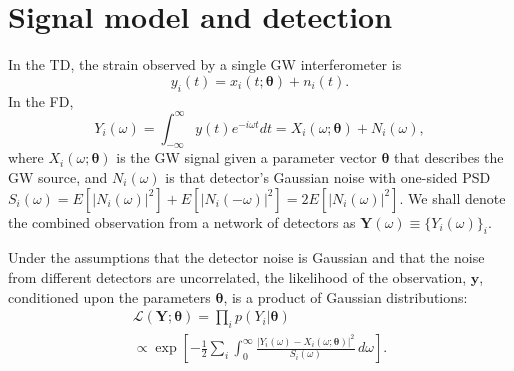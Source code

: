 \documentclass[amsmath,amssymb,aps,prx,reprint,nopreprintnumbers,nofootinbib]{revtex4-1}
\begin{document}

\section{Signal model and detection}
\label{sec:detection}

In the \ac{TD}, the strain observed by a single \ac{GW} interferometer is
%
\begin{equation}
    y_i(t) = x_i (t; \bm\theta) + n_i (t).
\end{equation}
%
In the \ac{FD},
%
\begin{equation}\label{eq:signal-model}
    Y_i (\omega) = \int_{-\infty}^\infty y(t) e^{-i \omega t} dt = X_i (\omega; \bm\theta) + N_i (\omega),
\end{equation}
%
where $X_i (\omega; \bm\theta)$ is the \ac{GW} signal given a parameter vector $\bm\theta$ that describes the \ac{GW} source, and $N_i (\omega)$ is that detector's Gaussian noise with one\nobreakdashes-sided \ac{PSD} $S_i(\omega) = E\left[\left|N_i(\omega)\right|^2\right] + E\left[\left|N_i(-\omega)\right|^2\right] = 2 E\left[\left|N_i(\omega)\right|^2\right]$. We shall denote the combined observation from a network of detectors as $\mathbf Y (\omega) \equiv \{Y_i (\omega)\}_i$.

Under the assumptions that the detector noise is Gaussian and that the noise from different detectors are uncorrelated, the likelihood of the observation, $\mathbf y$, conditioned upon the parameters $\bm\theta$, is a product of Gaussian distributions:
%
\begin{multline}\label{eq:gaussian-likelihood}
    \mathcal{L}(\mathbf Y; \bm\theta) = \prod_i p(Y_i | \bm\theta)
        \\
        \propto \exp \left[
        - \frac{1}{2} \sum_i \int_0^\infty \frac{\left|Y_i (\omega)
            - X_i(\omega; \bm\theta) \right|^2}{S_i(\omega)} \, d\omega
    \right].
\end{multline}
\end{document}
